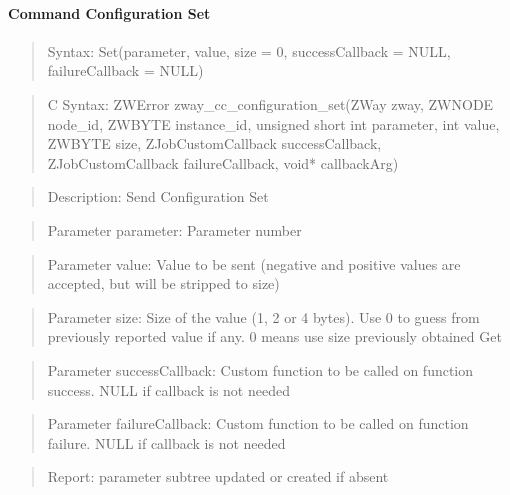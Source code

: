 \paragraph{Command Configuration Set}
\begin{quote}Syntax: Set(parameter, value, size = 0, successCallback = NULL, failureCallback = NULL)\end{quote}
\begin{quote}C Syntax: ZWError zway\_cc\_configuration\_set(ZWay zway, ZWNODE node\_id, ZWBYTE instance\_id, unsigned short int parameter, int value, ZWBYTE size, ZJobCustomCallback successCallback, ZJobCustomCallback failureCallback, void* callbackArg)\end{quote}
\begin{quote}Description: Send Configuration Set\end{quote}
\begin{quote}Parameter parameter: Parameter number\end{quote}
\begin{quote}Parameter value: Value to be sent (negative and positive values are accepted, but will be stripped to size)\end{quote}
\begin{quote}Parameter size: Size of the value (1, 2 or 4 bytes). Use 0 to guess from previously reported value if any. 0 means use size previously obtained Get\end{quote}
\begin{quote}Parameter successCallback: Custom function to be called on function success. NULL if callback is not needed\end{quote}
\begin{quote}Parameter failureCallback: Custom function to be called on function failure. NULL if callback is not needed\end{quote}
\begin{quote}Report: parameter subtree updated or created if absent\end{quote}

